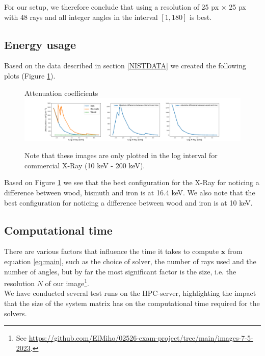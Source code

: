 \documentclass{article}
\begin{document}
\noindent For our setup, we therefore conclude that using a resolution of 25 px $\times$ 25 px with 48 rays and all integer angles in the interval $[1, 180]$ is best.

\subsection{Energy usage}\label{sec:energy-usage}
Based on the data described in section \ref{NISTDATA} we created the following plots (Figure \ref{fig:both-attenuation-coeff-plots}).
\begin{figure}[H]
    \centering
    \large{Attenuation coefficients} \\
    \includegraphics[scale=0.26]{images/combined-plot-attenuation.png}
    \caption{\small Note that these images are only plotted in the log interval for commercial X-Ray (10 keV - 200 keV).}
    \label{fig:both-attenuation-coeff-plots}
\end{figure} 

\noindent Based on Figure \ref{fig:both-attenuation-coeff-plots} we see that the best configuration for the X-Ray for noticing a difference between wood, bismuth and iron is at 16.4 keV. We also note that the best configuration for noticing a difference between wood and iron is at 10 keV.  

\subsection{Computational time}\label{sec:computational-time}
There are various factors that influence the time it takes to compute $\mathbf{x}$ from equation \ref{eq:main}, such as the choice of solver, the number of rays used and the number of angles, but by far the most significant factor is the size, i.e. the resolution $N$ of our image\footnote[11]{See \url{https://github.com/ElMiho/02526-exam-project/tree/main/images-7-5-2023}.}. \\
We have conducted several test runs on the HPC-server, highlighting the impact that the size of the system matrix has on the computational time required for the solvers\footnotemark[11].
\end{document}
